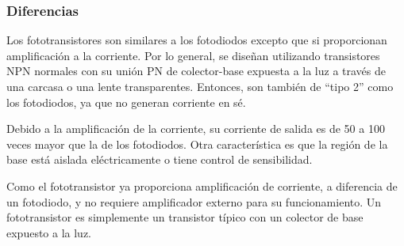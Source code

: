 \documentclass[a4paper,11pt]{report}    %
\begin{document}
\subsubsection{Diferencias}

Los fototransistores son similares a los fotodiodos excepto que si proporcionan amplificación a la corriente. Por lo general, se diseñan utilizando transistores NPN normales con su unión PN de colector-base expuesta a la luz a través de una carcasa o una lente transparentes. Entonces, son también de “tipo 2” como los fotodiodos, ya que no generan corriente en sé.

Debido a la amplificación de la corriente, su corriente de salida es de 50 a 100 veces mayor que la de los fotodiodos. Otra característica es que la región de la base está aislada eléctricamente o tiene control de sensibilidad.

Como el fototransistor ya proporciona amplificación de corriente, a diferencia de un fotodiodo, y no requiere amplificador externo para su funcionamiento. Un fototransistor es simplemente un transistor típico con un colector de base expuesto a la luz.
\end{document}
